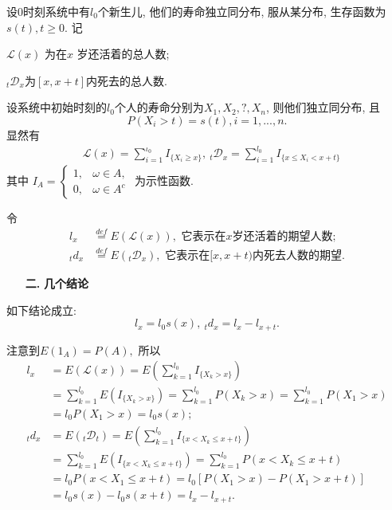 \documentclass[a4paper,10pt]{ctexbook}
\newcommand{\hei}{\CJKfamily{hei}}      %
\begin{document}
设0时刻系统中有$l_0$个新生儿, 他们的寿命独立同分布, 服从某分布, 生存函数为$s(t),t\ge 0.$  记

$\mathscr{L}(x)$ 为在$x$ 岁还活着的总人数;

$_t \mathscr{D}_x$为$[x,x+t]$内死去的总人数.

设系统中初始时刻的$l_0$个人的寿命分别为$X_1,X_2,?,X_n$, 则他们独立同分布, 且
$$P(X_i>t)=s(t), i=1,...,n.$$
显然有
\begin{align*}
     & \mathscr{L}(x)=\sum_{i=1}^{\iota_{\mathrm{0}}}I_{\{X_{i}\geqslant x\}},\ {}_t\mathscr{D}_x=\sum_{i=1}^{l_0}I_{\{ x\leqslant X_i<x+t\}}
\end{align*}
其中
$
    I_{A}=\left\{\begin{array}{ll}1,&\omega\in A,\\0,&\omega\in A^c\end{array}\right.
$ 为示性函数.

令 \begin{align*}
    l_x     & \overset{def}{=}E(\mathscr L(x)), \text{ 它表示在}x\text{岁还活着的期望人数};         \\
    {}_td_x & \overset{def}{=}E({}_t\mathscr D_x ),\text{ 它表示在}[x,x+t)\text{内死去人数的期望}.
\end{align*}



\begin{itemize}
    \item[{\bf\hei 二.}]{\bf\hei 几个结论}
\end{itemize}

\begin{proposition} 如下结论成立:
    $$l_x=l_0s(x),\ {}_td_x=l_x-l_{x+t}.$$
\end{proposition}
\proof 注意到$E(1_A)=P(A),$ 所以
\begin{align*}
    l_x     & =E(\mathscr{L}(x))=E(\sum_{k=1}^{l_0}I_{\{X_k>x\}})                        \\
            & =\sum_{k=1}^{l_0}E(I_{\{X_k>x\}})
    =\sum_{k=1}^{l_0}P(X_k>x)
    =\sum_{k=1}^{l_0}P(X_1>x)                                                            \\
            & =l_0P(X_1>x)=l_0s(x);                                                      \\
    {}_td_x & =E(_t\mathscr{D}_t)=E(\sum_{k=1}^{l_0}I_{\{x<X_k\leq x+t\}})               \\
            & =\sum_{k=1}^{l_0}E(I_{\{x<X_k\leq x+t\}})=\sum_{k=1}^{l_0}P(x<X_k\leq x+t) \\
            & =l_0P(x<X_1\leq x+t)=l_0[P(X_1>x)-P(X_1>x+t)]                              \\
            & =l_0s(x)-l_0s(x+t)
    =l_x-l_{x+t}.
\end{align*}
\end{document}
